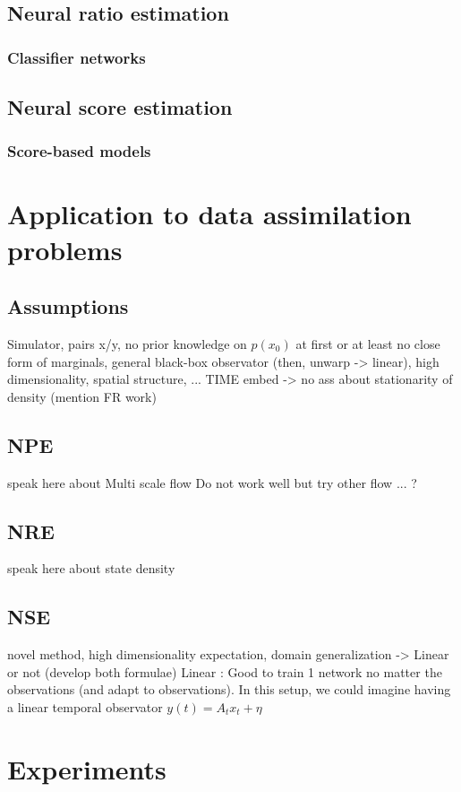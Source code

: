 \documentclass[a4paper, 12pt]{article}
\begin{document}
\subsection{Neural ratio estimation}
\subsubsection{Classifier networks}
\subsection{Neural score estimation}
\subsubsection{Score-based models}

\section{Application to data assimilation problems}
\subsection{Assumptions}
Simulator, pairs x/y, no prior knowledge on $p(x_0)$ at first or at least no close form of marginals,
general black-box observator (then, unwarp -> linear), high dimensionality,
spatial structure, ... TIME embed -> no ass about stationarity of density (mention FR work)

\subsection{NPE}
speak here about Multi scale flow
Do not work well but try other flow ... ?
\subsection{NRE}
speak here about state density 
\subsection{NSE}
novel method, high dimensionality expectation, domain generalization
-> Linear or not (develop both formulae)
Linear : Good to train 1 network no matter the observations (and adapt to observations). In this 
setup, we could imagine having a linear temporal observator $y(t) = A_t x_t + \eta$
\section{Experiments}
\end{document}
